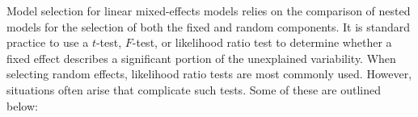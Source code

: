 \documentclass[12pt]{article} %
\newcommand{\hh}[1]{{\color{orange} #1}}
\newcommand{\alnote}[1]{\todo[inline,color=green!40]{#1}} %
\begin{document}
 Model selection for linear mixed-effects models relies on the comparison of nested models for the selection of both the fixed and random components. 
It is standard practice to use a $t$-test, $F$-test, or likelihood ratio test to determine whether a fixed effect describes a significant portion of the unexplained variability. %
When selecting random effects, likelihood ratio tests are most commonly used. 
However, situations often arise that complicate such tests. 
Some of these are outlined below:
\end{document}

